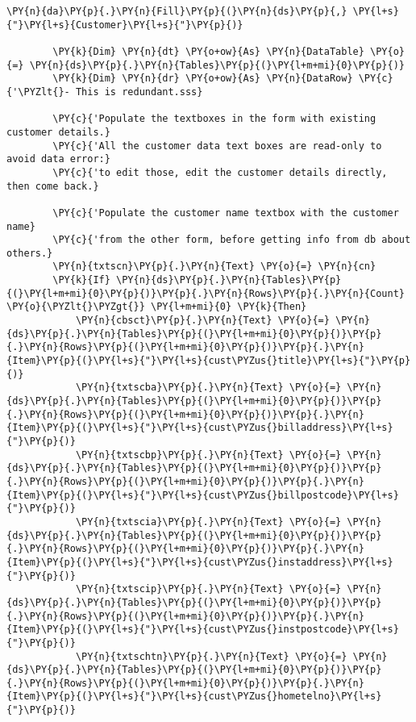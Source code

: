 \begin{Verbatim}[commandchars=\\\{\}]
        \PY{n}{da}\PY{p}{.}\PY{n}{Fill}\PY{p}{(}\PY{n}{ds}\PY{p}{,} \PY{l+s}{"}\PY{l+s}{Customer}\PY{l+s}{"}\PY{p}{)}

        \PY{k}{Dim} \PY{n}{dt} \PY{o+ow}{As} \PY{n}{DataTable} \PY{o}{=} \PY{n}{ds}\PY{p}{.}\PY{n}{Tables}\PY{p}{(}\PY{l+m+mi}{0}\PY{p}{)}
        \PY{k}{Dim} \PY{n}{dr} \PY{o+ow}{As} \PY{n}{DataRow} \PY{c}{'\PYZlt{}- This is redundant.sss}

        \PY{c}{'Populate the textboxes in the form with existing customer details.}
        \PY{c}{'All the customer data text boxes are read-only to avoid data error:}
        \PY{c}{'to edit those, edit the customer details directly, then come back.}

        \PY{c}{'Populate the customer name textbox with the customer name}
        \PY{c}{'from the other form, before getting info from db about others.}
        \PY{n}{txtscn}\PY{p}{.}\PY{n}{Text} \PY{o}{=} \PY{n}{cn}
        \PY{k}{If} \PY{n}{ds}\PY{p}{.}\PY{n}{Tables}\PY{p}{(}\PY{l+m+mi}{0}\PY{p}{)}\PY{p}{.}\PY{n}{Rows}\PY{p}{.}\PY{n}{Count} \PY{o}{\PYZlt{}\PYZgt{}} \PY{l+m+mi}{0} \PY{k}{Then}
            \PY{n}{cbsct}\PY{p}{.}\PY{n}{Text} \PY{o}{=} \PY{n}{ds}\PY{p}{.}\PY{n}{Tables}\PY{p}{(}\PY{l+m+mi}{0}\PY{p}{)}\PY{p}{.}\PY{n}{Rows}\PY{p}{(}\PY{l+m+mi}{0}\PY{p}{)}\PY{p}{.}\PY{n}{Item}\PY{p}{(}\PY{l+s}{"}\PY{l+s}{cust\PYZus{}title}\PY{l+s}{"}\PY{p}{)}
            \PY{n}{txtscba}\PY{p}{.}\PY{n}{Text} \PY{o}{=} \PY{n}{ds}\PY{p}{.}\PY{n}{Tables}\PY{p}{(}\PY{l+m+mi}{0}\PY{p}{)}\PY{p}{.}\PY{n}{Rows}\PY{p}{(}\PY{l+m+mi}{0}\PY{p}{)}\PY{p}{.}\PY{n}{Item}\PY{p}{(}\PY{l+s}{"}\PY{l+s}{cust\PYZus{}billaddress}\PY{l+s}{"}\PY{p}{)}
            \PY{n}{txtscbp}\PY{p}{.}\PY{n}{Text} \PY{o}{=} \PY{n}{ds}\PY{p}{.}\PY{n}{Tables}\PY{p}{(}\PY{l+m+mi}{0}\PY{p}{)}\PY{p}{.}\PY{n}{Rows}\PY{p}{(}\PY{l+m+mi}{0}\PY{p}{)}\PY{p}{.}\PY{n}{Item}\PY{p}{(}\PY{l+s}{"}\PY{l+s}{cust\PYZus{}billpostcode}\PY{l+s}{"}\PY{p}{)}
            \PY{n}{txtscia}\PY{p}{.}\PY{n}{Text} \PY{o}{=} \PY{n}{ds}\PY{p}{.}\PY{n}{Tables}\PY{p}{(}\PY{l+m+mi}{0}\PY{p}{)}\PY{p}{.}\PY{n}{Rows}\PY{p}{(}\PY{l+m+mi}{0}\PY{p}{)}\PY{p}{.}\PY{n}{Item}\PY{p}{(}\PY{l+s}{"}\PY{l+s}{cust\PYZus{}instaddress}\PY{l+s}{"}\PY{p}{)}
            \PY{n}{txtscip}\PY{p}{.}\PY{n}{Text} \PY{o}{=} \PY{n}{ds}\PY{p}{.}\PY{n}{Tables}\PY{p}{(}\PY{l+m+mi}{0}\PY{p}{)}\PY{p}{.}\PY{n}{Rows}\PY{p}{(}\PY{l+m+mi}{0}\PY{p}{)}\PY{p}{.}\PY{n}{Item}\PY{p}{(}\PY{l+s}{"}\PY{l+s}{cust\PYZus{}instpostcode}\PY{l+s}{"}\PY{p}{)}
            \PY{n}{txtschtn}\PY{p}{.}\PY{n}{Text} \PY{o}{=} \PY{n}{ds}\PY{p}{.}\PY{n}{Tables}\PY{p}{(}\PY{l+m+mi}{0}\PY{p}{)}\PY{p}{.}\PY{n}{Rows}\PY{p}{(}\PY{l+m+mi}{0}\PY{p}{)}\PY{p}{.}\PY{n}{Item}\PY{p}{(}\PY{l+s}{"}\PY{l+s}{cust\PYZus{}hometelno}\PY{l+s}{"}\PY{p}{)}

\end{Verbatim}
